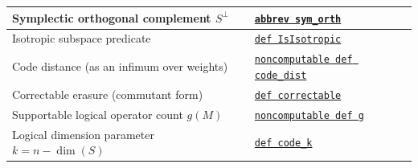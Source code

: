 \documentclass[11pt]{article}
\theoremstyle{plain}
\theoremstyle{definition}
\begin{document}
\begin{center}
\begin{tabular}{|p{}|p{}|}
\hline
Symplectic orthogonal complement $S^\perp$ &
\href{https://github.com/Shilun-Allan-Li/tcslib/blob/9c7f65d5b18b64bc56760a2a09dfe6fe3305b8d6/TCSlib/ErrorCorrectingCodes/QuantumSingleton.lean#L366-L370}{\texttt{abbrev sym\_orth}}\\
\hline
Isotropic subspace predicate &
\href{https://github.com/Shilun-Allan-Li/tcslib/blob/9c7f65d5b18b64bc56760a2a09dfe6fe3305b8d6/TCSlib/ErrorCorrectingCodes/QuantumSingleton.lean#L371-L374}{\texttt{def IsIsotropic}}\\
\hline
Code distance (as an infimum over weights) &
\href{https://github.com/Shilun-Allan-Li/tcslib/blob/9c7f65d5b18b64bc56760a2a09dfe6fe3305b8d6/TCSlib/ErrorCorrectingCodes/QuantumSingleton.lean#L375-L383}{\texttt{noncomputable def code\_dist}}\\
\hline
Correctable erasure (commutant form) &
\href{https://github.com/Shilun-Allan-Li/tcslib/blob/9c7f65d5b18b64bc56760a2a09dfe6fe3305b8d6/TCSlib/ErrorCorrectingCodes/QuantumSingleton.lean#L384-L392}{\texttt{def correctable}}\\
\hline
Supportable logical operator count $g(M)$ &
\href{https://github.com/Shilun-Allan-Li/tcslib/blob/9c7f65d5b18b64bc56760a2a09dfe6fe3305b8d6/TCSlib/ErrorCorrectingCodes/QuantumSingleton.lean#L421-L437}{\texttt{noncomputable def g}}\\
\hline
Logical dimension parameter $k = n-\dim(S)$ &
\href{https://github.com/Shilun-Allan-Li/tcslib/blob/9c7f65d5b18b64bc56760a2a09dfe6fe3305b8d6/TCSlib/ErrorCorrectingCodes/QuantumSingleton.lean#L994-L1001}{\texttt{def code\_k}}\\
\hline
\end{tabular}
\end{center}
\end{document}
